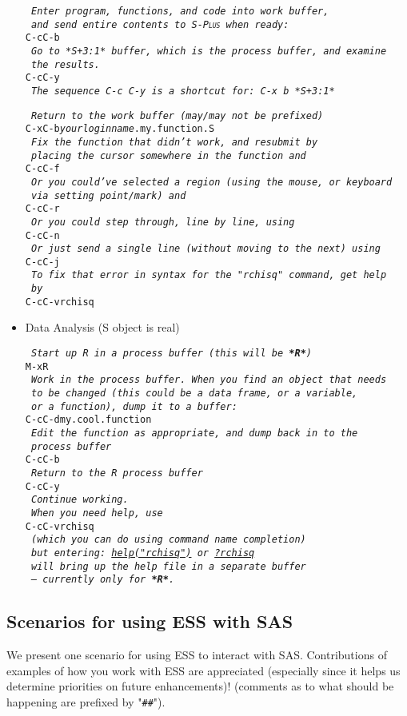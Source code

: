 \documentclass{article}
\newcommand*{\Splus}{\textsc{S-Plus}}
\newcommand*{\Scmt}[1]{\hbox{\qquad {\footnotesize \#\#} \textsl{#1}}}
\newenvironment{Salltt}{\small\begin{alltt}}{\end{alltt}}
\begin{document}
\begin{itemize}
\begin{Salltt}
  \Scmt{Enter program, functions, and code into work buffer,}
  \Scmt{and send entire contents to \Splus\ when ready:}
  C-c C-b
  \Scmt{Go to *S+3:1* buffer, which is the process buffer, and examine}
  \Scmt{the results.}
  C-c C-y
  \Scmt{The sequence C-c C-y is a shortcut for:  C-x b *S+3:1*}

  \Scmt{Return to the work buffer (may/may not be prefixed)}
  C-x C-b \textit{yourloginname}.my.function.S
  \Scmt{Fix the function that didn't work, and resubmit by}
  \Scmt{placing the cursor somewhere in the function and}
  C-c C-f
  \Scmt{Or you could've selected a region (using the mouse, or keyboard}
  \Scmt{via setting point/mark) and}
  C-c C-r
  \Scmt{Or you could step through, line by line, using}
  C-c C-n
  \Scmt{Or just send a single line (without moving to the next) using}
  C-c C-j
  \Scmt{To fix that error in syntax for the "rchisq" command, get help}
  \Scmt{by}
  C-c C-v rchisq
\end{Salltt}
\item Data Analysis (S object is real)
\begin{Salltt}
  \Scmt{Start up R in a process buffer (this will be \textbf{*R*})} 
  M-x R
  \Scmt{Work in the process buffer.  When you find an object that needs}
  \Scmt{to be changed (this could be a data frame, or a variable,}
  \Scmt{or a function), dump it to a buffer:}
  C-c C-d my.cool.function
  \Scmt{Edit the function as appropriate, and dump back in to the}
  \Scmt{process buffer}
  C-c C-b
  \Scmt{Return to the R process buffer}
  C-c C-y
  \Scmt{Continue working.}
  \Scmt{When you need help, use}
  C-c C-v rchisq
  \Scmt{(which you can do using command name completion)}
  \Scmt{but entering:   \underline{help("rchisq")} or  \underline{?rchisq}}
  \Scmt{will bring up the help file in a separate buffer}
  \Scmt{\emph{--- currently only for \textbf{*R*}}.}
\end{Salltt}
\end{itemize}


\subsection{Scenarios for using ESS with SAS}
\label{sec:SAS:scen}

We present one scenario for using ESS to interact with SAS.
Contributions of examples of how you work with ESS are appreciated
(especially since it helps us determine priorities on future
enhancements)! (comments as to what should be happening are prefixed
by "\verb+##+").
\end{document}
